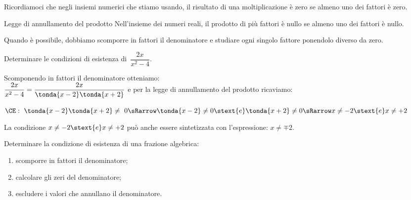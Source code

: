 
Ricordiamoci che negli insiemi numerici che stiamo usando, il risultato 
di una moltiplicazione è zero se almeno uno dei fattori è zero.

\begin{teorema}{Legge di annullamento del prodotto}{}
Nell'insieme dei numeri reali, il prodotto di più fattori è nullo se 
almeno uno dei fattori è nullo.
\end{teorema}

Quando è possibile, dobbiamo scomporre in fattori il denominatore e 
studiare ogni singolo fattore ponendolo diverso da zero.

\begin{esempio}{}{}
Determinare le condizioni di esistenza di~\(\dfrac{2x}{x^{2}-4}\).

Scomponendo in fattori il denominatore otteniamo:\\
\(\dfrac{2x}{x^{2}-4} = \dfrac{2x}{\tonda{x-2}\tonda{x+2}}\)\quad
e per la legge di annullamento del prodotto ricaviamo:

\(\CE:~ \tonda{x-2}\tonda{x+2} \neq~0 \sRarrow 
\tonda{x-2} \neq 0 \stext{e} \tonda{x+2} \neq 0\\
\sRarrow x \neq -2 \stext{e} x \neq +2\)

La condizione \(x \neq -2 \stext{e} x \neq +2\) può anche essere 
sintetizzata con l'espressione: \(x \neq \mp 2\).
\end{esempio}

\begin{procedura}{}{}
Determinare la condizione di esistenza di una frazione algebrica:
\begin{enumerate}[nosep, label=\alph*)]
\item scomporre in fattori il denominatore;
\item calcolare gli zeri del denominatore;
\item escludere i valori che annullano il denominatore.
\end{enumerate}
\end{procedura}


